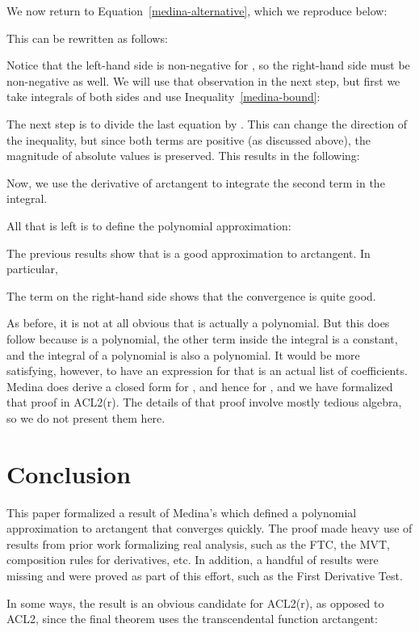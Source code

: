 \documentclass[copyright,creativecommons]{eptcs}
\begin{document}
We now return to Equation~\ref{medina-alternative}, which we reproduce
below:

This can be rewritten as follows:

Notice that the left-hand side is non-negative for , so
the right-hand side must be non-negative as well. We will use that
observation in the next step, but first we take integrals of both
sides and use Inequality~\ref{medina-bound}:

The next step is to divide the last equation by .  This
can change the direction of the inequality, but since both terms are
positive (as discussed above), the magnitude of absolute values is
preserved.  This results in the following:


Now, we use the derivative of arctangent to integrate the second term
in the integral.

All that is left is to define the polynomial approximation:

The previous results show that  is a good approximation to
arctangent.  In particular,

The  term on the right-hand side shows that the convergence
is quite good.

As before, it is not at all obvious that  is actually a
polynomial. But this does follow because  is a polynomial,
the other term inside the integral is a constant, and the integral of
a polynomial is also a polynomial. It would be more satisfying,
however, to have an expression for  that is an actual list of
coefficients. Medina does derive a closed form for , and hence
for , and we have formalized that proof in ACL2(r). The details
of that proof involve mostly tedious algebra, so we do not present
them here.

\section{Conclusion}
\label{conclusion}

This paper formalized a result of Medina's which defined a polynomial
approximation to arctangent that converges quickly. The proof made
heavy use of results from prior work formalizing real analysis, such
as the FTC, the MVT, composition rules for derivatives, etc. In
addition, a handful of results were missing and were proved as part of
this effort, such as the First Derivative Test.

In some ways, the result is an obvious candidate for ACL2(r), as
opposed to ACL2, since the final theorem uses the transcendental
function arctangent:
\end{document}
